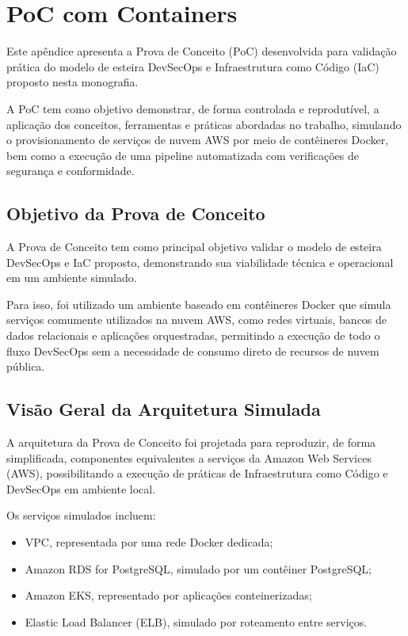 \chapter{PoC com Containers}
\label{apendice:poc-devsecops}

Este apêndice apresenta a Prova de Conceito (PoC) desenvolvida para validação prática
do modelo de esteira DevSecOps e Infraestrutura como Código (IaC) proposto nesta
monografia.

A PoC tem como objetivo demonstrar, de forma controlada e reprodutível, a aplicação
dos conceitos, ferramentas e práticas abordadas no trabalho, simulando o
provisionamento de serviços de nuvem AWS por meio de contêineres Docker, bem como
a execução de uma pipeline automatizada com verificações de segurança e conformidade.


\section{Objetivo da Prova de Conceito}

A Prova de Conceito tem como principal objetivo validar o modelo de esteira DevSecOps
e IaC proposto, demonstrando sua viabilidade técnica e operacional em um ambiente
simulado.

Para isso, foi utilizado um ambiente baseado em contêineres Docker que simula serviços
comumente utilizados na nuvem AWS, como redes virtuais, bancos de dados relacionais
e aplicações orquestradas, permitindo a execução de todo o fluxo DevSecOps sem a
necessidade de consumo direto de recursos de nuvem pública.


\section{Visão Geral da Arquitetura Simulada}

A arquitetura da Prova de Conceito foi projetada para reproduzir, de forma simplificada,
componentes equivalentes a serviços da Amazon Web Services (AWS), possibilitando a
execução de práticas de Infraestrutura como Código e DevSecOps em ambiente local.

Os serviços simulados incluem:

\begin{itemize}
  \item VPC, representada por uma rede Docker dedicada;
  \item Amazon RDS for PostgreSQL, simulado por um contêiner PostgreSQL;
  \item Amazon EKS, representado por aplicações conteinerizadas;
  \item Elastic Load Balancer (ELB), simulado por roteamento entre serviços.
\end{itemize}

